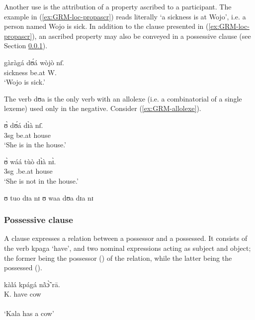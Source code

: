 Another use is the attribution of a property ascribed to a participant. The
example in (\ref{ex:GRM-loc-propascr}) reads literally `a sickness is at Wojo', 
i.e. a person named Wojo is sick.  In addition to the clause presented in
(\ref{ex:GRM-loc-propascr}), an ascribed property may also be conveyed in a
possessive clause (see Section \ref{sec:GRM-poss-cl}). 


\ea\label{ex:GRM-loc-propascr}
\gll gàràgá dʊ́á wòjò nɪ̄.\\
sickness be.at W. {\postp}\\
\glt  `Wojo is sick.'
\z

 The verb {\sls dʊa} is the only verb with an allolexe (i.e. a combinatorial 
 of a single lexeme) used only in the 
negative. Consider (\ref{ex:GRM-allolexe}).

\ea\label{ex:GRM-allolexe}

\ea\label{ex:GRM-allolexe-pos}
\gll ʊ̀  dʊ́á dɪ̀à nɪ̄.\\
{\sc 3sg} be.at house {\postp}\\
\glt  `She is in the house.'

\ex\label{ex:GRM-allolexe-neg}
\gll ʊ̀  wáá tùò dɪ̀à nɪ̀.\\
{\sc 3sg} {\neg} {\neg}.be.at house {\postp}\\
\glt  `She is not in the house.'


\ex\label{ex:GRM-allolexe-pos-out}
 \textasteriskcentered ʊ  tuo dɪa nɪ
\ex\label{ex:GRM-allolexe-neg-out}
 \textasteriskcentered ʊ  waa dʊa dɪa nɪ

\z 
 \z



\subsubsection{Possessive clause}
\label{sec:GRM-poss-cl}

A  clause expresses a relation between  a
possessor and a possessed.   It consists of
the verb {\sls kpaga} `have',  and two nominal expressions acting as subject and
object; the former being the possessor (\psor) of the relation, while  the
latter being  the possessed
(\psed).

\ea\label{ex:GRM-poss-have}
\glll kàlá kpágá nã̀ɔ̃̀ rā.\\
K. have cow {\foc}\\
  {\psor} {}   {\psed} {}\\
\glt  `Kala has a cow'
\z

